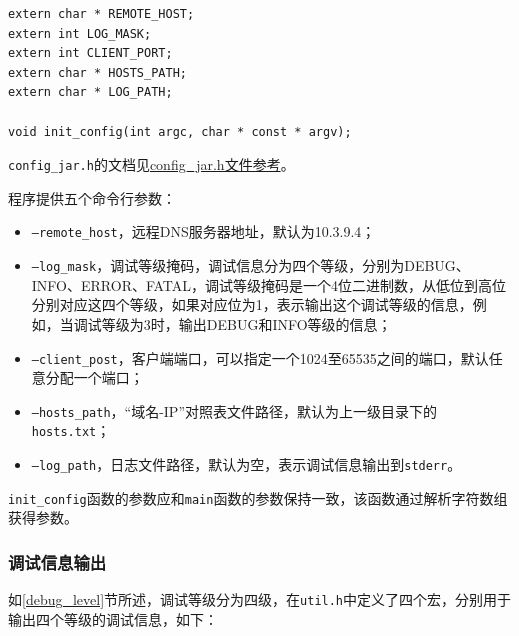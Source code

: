 \documentclass[lang=cn,11pt,a4paper,cite=authornum]{paper}
\begin{document}
\begin{code}
\begin{verbatim}
extern char * REMOTE_HOST; 
extern int LOG_MASK; 
extern int CLIENT_PORT; 
extern char * HOSTS_PATH; 
extern char * LOG_PATH; 
 
void init_config(int argc, char * const * argv);
\end{verbatim}
\end{code}

\texttt{config_jar.h}的文档见\href{run:./APIdoc/config__jar_8h.html}{config\_jar.h文件参考}。

程序提供五个命令行参数\label{para}：

\begin{itemize}
    \item \texttt{--remote_host}，远程DNS服务器地址，默认为10.3.9.4；
    \item \texttt{--log_mask}，\label{debug_level}调试等级掩码，调试信息分为四个等级，分别为DEBUG、INFO、ERROR、FATAL，调试等级掩码是一个4位二进制数，从低位到高位分别对应这四个等级，如果对应位为1，表示输出这个调试等级的信息，例如，当调试等级为3时，输出DEBUG和INFO等级的信息；
    \item \texttt{--client_post}，客户端端口，可以指定一个1024至65535之间的端口，默认任意分配一个端口；
    \item \texttt{--hosts_path}，“域名-IP”对照表文件路径，默认为上一级目录下的\texttt{hosts.txt}；
    \item \texttt{--log_path}，日志文件路径，默认为空，表示调试信息输出到\texttt{stderr}。
\end{itemize}

\texttt{init_config}函数的参数应和\texttt{main}函数的参数保持一致，该函数通过解析字符数组获得参数。

\subsubsection{调试信息输出}

如\ref{debug_level}节所述，调试等级分为四级，在\texttt{util.h}中定义了四个宏，分别用于输出四个等级的调试信息，如下：
\end{document}
